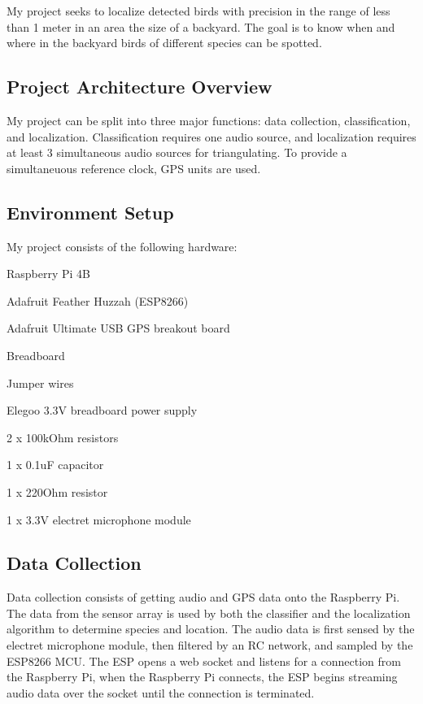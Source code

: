 \documentclass[12pt]{article}
\begin{document}
My project seeks to localize detected birds with precision in the range of less than 1 meter in an area the size of a backyard. The goal is to know when and where in the backyard birds of different species can be spotted. 


\subsection{Project Architecture Overview}
	My project can be split into three major functions: data collection, classification, and localization. Classification requires one audio source, and localization requires at least 3 simultaneous audio sources for triangulating. To provide a simultaneuous reference clock, GPS units are used. 

\subsection{Environment Setup}

	My project consists of the following hardware:
\lstlisting{}
\item{Raspberry Pi 4B}
\item{Adafruit Feather Huzzah (ESP8266)}
\item{Adafruit Ultimate USB GPS breakout board}
\item{Breadboard}
\item{Jumper wires}
\item{Elegoo 3.3V breadboard power supply}
\item{2 x 100kOhm resistors}
\item{1 x 0.1uF capacitor}
\item{1 x 220Ohm resistor}
\item{1 x 3.3V electret microphone module}
	

\subsection{Data Collection}
Data collection consists of getting audio and GPS data onto the Raspberry Pi. The data from the sensor array is used by both the classifier and the localization algorithm to determine species and location. The audio data is first sensed by the electret microphone module, then filtered by an RC network, and sampled by the ESP8266 MCU. The ESP opens a web socket and listens for a connection from the Raspberry Pi, when the Raspberry Pi connects, the ESP begins streaming audio data over the socket until the connection is terminated.
\end{document}
